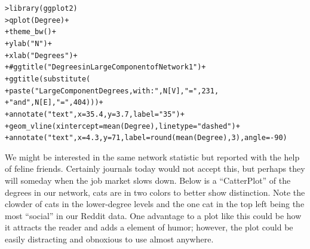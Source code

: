 \documentclass[12pt]{article}\usepackage[]{graphicx}\usepackage[]{color}
\makeatletter
\newcommand{\hlnum}[1]{\textcolor[rgb]{0.82,0.78,0.62}{#1}}%
\newcommand{\hlstr}[1]{\textcolor[rgb]{0.82,0.78,0.62}{#1}}%
\newcommand{\hlcom}[1]{\textcolor[rgb]{0.404,0.408,0.42}{#1}}%
\newcommand{\hlopt}[1]{\textcolor[rgb]{0.882,0.878,0.898}{#1}}%
\newcommand{\hlstd}[1]{\textcolor[rgb]{0.882,0.878,0.898}{#1}}%
\newcommand{\hlkwc}[1]{\textcolor[rgb]{0.812,0.522,0.388}{#1}}%
\newcommand{\hlkwd}[1]{\textcolor[rgb]{0.733,0.388,0.812}{#1}}%
\newenvironment{kframe}{%
 \def\at@end@of@kframe{}%
 \ifinner\ifhmode%
  \def\at@end@of@kframe{\end{minipage}}%
  \begin{minipage}{\columnwidth}%
 \fi\fi%
 \def\FrameCommand##1{\hskip\@totalleftmargin \hskip-\fboxsep
 \colorbox{shadecolor}{##1}\hskip-\fboxsep
     \hskip-\linewidth \hskip-\@totalleftmargin \hskip\columnwidth}%
 \MakeFramed {\advance\hsize-\width
   \@totalleftmargin\z@ \linewidth\hsize
   \@setminipage}}%
 {\par\unskip\endMakeFramed%
 \at@end@of@kframe}
\newenvironment{knitrout}{}{} %
\makeatother
\begin{document}
\begin{flushleft}
\begin{center}
\begin{knitrout}
\begin{kframe}
{\ttfamily\noindent\bfseries\color{errorcolor}{\#\# Error in h(simpleError(msg, call)): error in evaluating the argument 'x' in selecting a method for function 'mean': object 'Degree' not found}}\begin{alltt}
\hlstd{> }\hlkwd{library}\hlstd{(ggplot2)}
\hlstd{> }\hlkwd{qplot}\hlstd{(Degree)}\hlopt{+}
\hlstd{+ }     \hlkwd{theme_bw}\hlstd{()}\hlopt{+}
\hlstd{+ }     \hlkwd{ylab}\hlstd{(}\hlstr{"N"}\hlstd{)}\hlopt{+}
\hlstd{+ }     \hlkwd{xlab}\hlstd{(}\hlstr{"Degrees"}\hlstd{)}\hlopt{+}
\hlstd{+ }     \hlcom{#ggtitle("Degrees in Large Component of Network 1")+}
\hlstd{+ }     \hlkwd{ggtitle}\hlstd{(}\hlkwd{substitute}\hlstd{(}
\hlstd{+ }          \hlkwd{paste}\hlstd{(} \hlstr{"Large Component Degrees, with: "}\hlstd{, N[V],} \hlstr{"="}\hlstd{,} \hlnum{231}\hlstd{,}
\hlstd{+ }                 \hlstr{" and "}\hlstd{, N[E],} \hlstr{"="}\hlstd{,} \hlnum{404}\hlstd{)))}\hlopt{+}
\hlstd{+ }     \hlkwd{annotate}\hlstd{(}\hlstr{"text"}\hlstd{,} \hlkwc{x} \hlstd{=} \hlnum{35.4}\hlstd{,} \hlkwc{y} \hlstd{=} \hlnum{3.7}\hlstd{,} \hlkwc{label} \hlstd{=} \hlstr{"35"}\hlstd{)}\hlopt{+}
\hlstd{+ }     \hlkwd{geom_vline}\hlstd{(}\hlkwc{xintercept}\hlstd{=}\hlkwd{mean}\hlstd{(Degree),} \hlkwc{linetype}\hlstd{=}\hlstr{"dashed"}\hlstd{)}\hlopt{+}
\hlstd{+ }     \hlkwd{annotate}\hlstd{(}\hlstr{"text"}\hlstd{,} \hlkwc{x} \hlstd{=} \hlnum{4.3}\hlstd{,} \hlkwc{y} \hlstd{=} \hlnum{71}\hlstd{,} \hlkwc{label} \hlstd{=} \hlkwd{round}\hlstd{(}\hlkwd{mean}\hlstd{(Degree),}\hlnum{3}\hlstd{),} \hlkwc{angle}\hlstd{=}\hlopt{-}\hlnum{90}\hlstd{)}
\end{alltt}


{\ttfamily\noindent\bfseries\color{errorcolor}{\#\# Error in eval\_tidy(mapping\$x, data, caller\_env): object 'Degree' not found}}\end{kframe}
\end{knitrout}
\end{center}

We might be interested in the same network statistic but reported with the help of feline friends. Certainly journals today would not accept this, but perhaps they will someday when the job market slows down. Below is a ``CatterPlot'' of the degrees in our network, cats are in two colors to better show distinction. Note the clowder of cats in the lower-degree levels and the one cat in the top left being the most ``social'' in our Reddit data. One advantage to a plot like this could be how it attracts the reader and adds a element of humor; however, the plot could be easily distracting and obnoxious to use almost anywhere. 


\end{flushleft}
\end{document}
